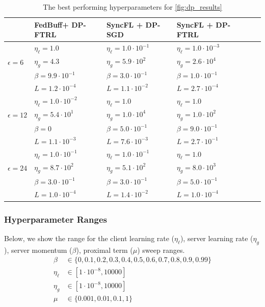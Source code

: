\documentclass[twoside]{article}
\newcommand\Tstrut{\rule{0pt}{2.6ex}}         %
\newcommand{\algname}{{FedBuff}\xspace}
\begin{document}
\begin{table}
\centering
\caption{The best performing hyperparameters for \cref{fig:dp_results}}
\label{tab:dp_hp}
\begin{tabular}{llllll} 
\toprule
 & \algname + DP-FTRL & SyncFL + DP-SGD & SyncFL + DP-FTRL\\
\hline
\Tstrut{}
               &  $\eta_{\ell}=1.0$ &  $\eta_{\ell}=1.0\cdot10^{-1}$ &  $\eta_{\ell}=1.0\cdot10^{-3}$  \\     
$\epsilon = 6$ & $\eta_g=4.3$ & $\eta_g=5.9\cdot10^{2}$ & $\eta_g=2.6\cdot10^{4}$ \\ 
               & $\beta=9.9\cdot10^{-1}$ & $\beta=3.0\cdot10^{-1}$ & $\beta=1.0\cdot10^{-1}$ \\
               & $L=1.2\cdot10^{-4}$ & $L=1.1\cdot10^{-2}$& $L=2.7\cdot10^{-4}$ \\
\hline
\Tstrut{}
               &  $\eta_{\ell}=1.0\cdot10^{-2}$ &  $\eta_{\ell}=1.0$ &  
               $\eta_{\ell}=1.0$  \\     
$\epsilon = 12$ & $\eta_g=5.4\cdot10^{1}$ & 
                $\eta_g=1.0\cdot10^{4}$ & $\eta_g=1.0\cdot10^{2}$ \\ 
                & $\beta=0$ & 
                $\beta=5.0\cdot10^{-1}$ & $\beta=9.0\cdot10^{-1}$ \\
                & $L=1.1\cdot10^{-3}$ & 
                $L=7.6\cdot10^{-3}$  & 
                $L=2.7\cdot10^{-1}$ \\
\hline
\Tstrut{}
               &  $\eta_{\ell}=1.0\cdot10^{-1}$ &  $\eta_{\ell}=1.0\cdot10^{-1}$ &  $\eta_{\ell}=1.0$  \\     
$\epsilon = 24 $ & $\eta_g=8.7\cdot10^{2}$ & 
                $\eta_g=5.1\cdot10^{2}$ & $\eta_g=8.0\cdot10^{3}$ \\ 
               & $\beta=3.0\cdot10^{-1}$ & $\beta=3.0\cdot10^{-1}$ & $\beta=5.0\cdot10^{-1}$ \\
               & $L=1.0\cdot10^{-4}$ & 
               $L=1.4\cdot10^{-2}$ & 
               $L=1.0\cdot10^{-4}$ \\
\bottomrule
\end{tabular}
\end{table}

\subsubsection{Hyperparameter Ranges}
Below, we show the range for the client learning rate ($\eta_{\ell}$), server learning rate ($\eta_g$), server momentum ($\beta$), proximal term ($\mu$) sweep ranges. 
\begin{align*}
\beta &\in \{0, 0.1, 0.2, 0.3, 0.4, 0.5, 0.6, 0.7, 0.8, 0.9, 0.99\} \\
\eta_{\ell} &\in [1\cdot10^{-8}, 10000] \\
\eta_g &\in [1\cdot10^{-8}, 10000] \\
\mu &\in \{0.001, 0.01, 0.1, 1\} \\
\end{align*}
\end{document}
